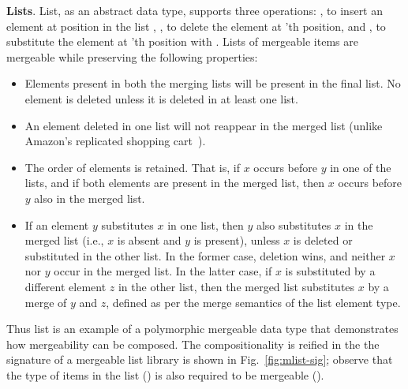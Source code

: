 

{\bf Lists}. List, as an abstract data type, supports three
operations: , to insert an element  at position
 in the list , , to delete the element at
'th position, and , to substitute the element at
'th position with . Lists of mergeable items are mergeable
while preserving the following properties:
\begin{itemize}
  \item Elements present in both the merging lists will be present in
  the final list. No element is deleted unless it is deleted in at
  least one list.
  \item An element deleted in one list will not reappear in the merged
  list (unlike Amazon's replicated shopping cart~\cite{dynamo}).
  \item The order of elements is retained. That is, if $x$ occurs
  before $y$ in one of the lists, and if both elements are present in
  the merged list, then $x$ occurs before $y$ also in the merged list.
  \item If an element $y$ substitutes $x$ in one list, then $y$ also
  substitutes $x$ in the merged list (i.e., $x$ is absent and $y$ is
  present), unless $x$ is deleted or substituted in the other list. In
  the former case, deletion wins, and neither $x$ nor $y$ occur in the
  merged list. In the latter case, if $x$ is substituted by a
  different element $z$ in the other list, then the merged list
  substitutes $x$ by a merge of $y$ and $z$, defined as per the merge
  semantics of the list element type.
\end{itemize}
Thus list is an example of a polymorphic mergeable data type that
demonstrates how mergeability can be composed. The compositionality is
reified in the the signature of a mergeable list library is shown in
Fig.~\ref{fig:mlist-sig}; observe that the type of items in the list
() is also required to be mergeable (). 

